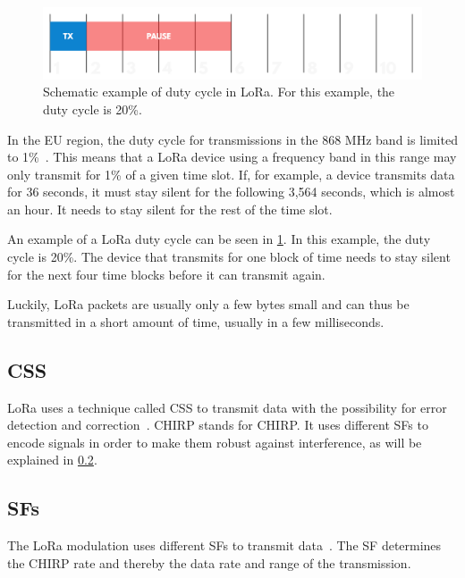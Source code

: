 \begin{figure}[htbp]
    \centering
    \includegraphics[width=.8\textwidth]{pictures/lora/duty-cycle-single-channel-off-air.png}
    \caption{
        Schematic example of duty cycle in \ac{LoRa}.
        For this example, the duty cycle is 20\%.~\protect\cite{the_things_industries_bv_duty_nodate}
    }\label{pic:lora-duty-cycle}
\end{figure}

In the \ac{EU} region, the duty cycle for transmissions in the 868 MHz band is limited to 1\%~\cite{etsi_etsi_2012}.
This means that a \ac{LoRa} device using a frequency band in this range may only transmit for 1\% of a given time slot.
If, for example, a device transmits data for 36 seconds, it must stay silent for the following 3,564 seconds, which is almost an hour.
It needs to stay silent for the rest of the time slot.

An example of a \ac{LoRa} duty cycle can be seen in \cref{pic:lora-duty-cycle}.
In this example, the duty cycle is 20\%.
The device that transmits for one block of time needs to stay silent for the next four time blocks before it can transmit again.

Luckily, LoRa packets are usually only a few bytes small and can thus be transmitted in a short amount of time, usually in a few milliseconds.

\subsection{\acf{CSS}}\label{sec:chirp-spread-spectrum}

\ac{LoRa} uses a technique called \acl{CSS} to transmit data with the possibility for error detection and correction~\cite{reynders_chirp_2016}.
\acs{CHIRP} stands for \acl{CHIRP}.
It uses different \aclp{SF} to encode signals in order to make them robust against interference, as will be explained in \cref{sec:spreading-factors}.

\subsection{\acfp{SF}}\label{sec:spreading-factors}

The \ac{LoRa} modulation uses different \acfp{SF} to transmit data~\cite{the_things_network_spreading_2023}.
The \acl{SF} determines the \ac{CHIRP} rate and thereby the data rate and range of the transmission.

